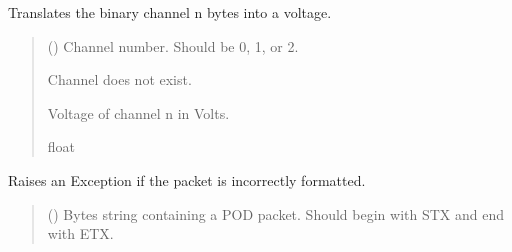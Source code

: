 \documentclass[letterpaper,10pt,english]{sphinxmanual}
\begin{document}
\begin{fulllineitems}
\begin{fulllineitems}
\begin{quote}
\begin{description}
\end{description}\end{quote}

\end{fulllineitems}


\begin{fulllineitems}
\label{\detokenize{Morelia.Packets:Morelia.Packets.Binary4.PacketBinary4.Ch}}
\pysigstartsignatures
{}
\pysigstopsignatures
\sphinxAtStartPar
Translates the binary channel n bytes into a voltage.
\begin{quote}\begin{description}
\sphinxAtStartPar
{} () \textendash{} Channel number. Should be 0, 1, or 2.

\sphinxAtStartPar
{} \textendash{} Channel does not exist.

\sphinxAtStartPar
Voltage of channel n in Volts.

\sphinxAtStartPar
float

\end{description}\end{quote}

\end{fulllineitems}


\begin{fulllineitems}
\label{\detokenize{Morelia.Packets:Morelia.Packets.Binary4.PacketBinary4.CheckIfPacketIsValid}}
\pysigstartsignatures
{}
\pysigstopsignatures
\sphinxAtStartPar
Raises an Exception if the packet is incorrectly formatted.
\begin{quote}\begin{description}
\sphinxAtStartPar
{} () \textendash{} Bytes string containing a POD packet. Should begin with STX                 and end with ETX.


\end{description}
\end{quote}
\end{fulllineitems}
\end{fulllineitems}
\end{document}
